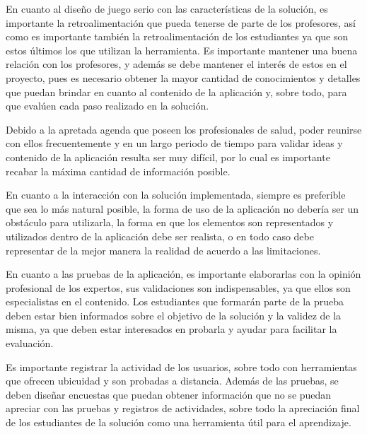 

En cuanto al diseño de juego serio con las características de la solución, es
importante la retroalimentación que pueda tenerse de parte de los profesores,
así como es importante también la retroalimentación de los estudiantes ya que
son estos últimos los que utilizan la herramienta. Es importante mantener una
buena relación con los profesores, y además se debe mantener el interés de estos
en el proyecto, pues es necesario obtener la mayor cantidad de conocimientos y
detalles que puedan brindar en cuanto al contenido de la aplicación y, sobre
todo, para que evalúen cada paso realizado en la solución.

Debido a la apretada agenda que poseen los profesionales de salud, poder
reunirse con ellos frecuentemente y en un largo periodo de tiempo para validar
ideas y contenido de la aplicación resulta ser muy difícil, por lo cual es
importante recabar la máxima cantidad de información posible.

En cuanto a la interacción con la solución implementada, siempre es preferible
que sea lo más natural posible, la forma de uso de la aplicación no debería ser
un obstáculo para utilizarla, la forma en que los elementos son representados y
utilizados dentro de la aplicación debe ser realista, o en todo caso debe
representar de la mejor manera la realidad de acuerdo a las limitaciones.

En cuanto a las pruebas de la aplicación, es importante elaborarlas con la
opinión profesional de los expertos, sus validaciones son indispensables, ya que
ellos son especialistas en el contenido. Los estudiantes que formarán parte de
la prueba deben estar bien informados sobre el objetivo de la solución y la
validez de la misma, ya que deben estar interesados en probarla y ayudar para
facilitar la evaluación. 

Es importante registrar la actividad de los usuarios, sobre todo con
herramientas que ofrecen ubicuidad y son probadas a distancia. Además de las
pruebas, se deben diseñar encuestas que puedan obtener información que no se
puedan apreciar con las pruebas y registros de actividades, sobre todo la
apreciación final de los estudiantes de la solución como una herramienta útil
para el aprendizaje.


